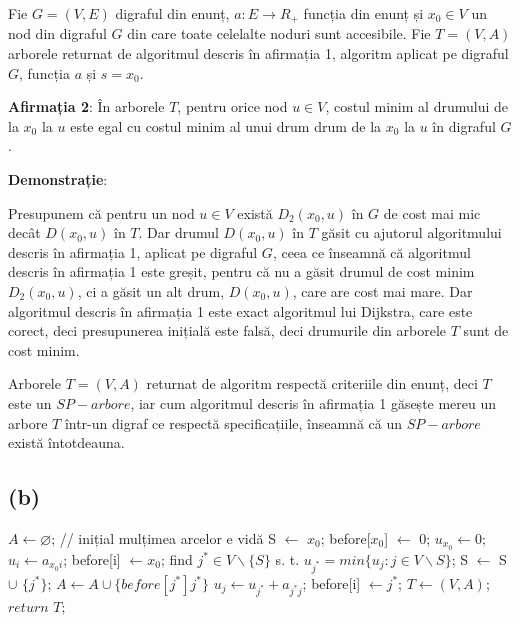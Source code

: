 \documentclass[a4paper,12pt]{article}
\begin{document}
Fie $G=(V,E)$ digraful din enunț, $a:E \rightarrow R _{+}$ funcția din enunț și $x_0 \in V$ un nod din digraful $G$ din care toate celelalte noduri sunt accesibile. Fie $T=(V,A)$ arborele returnat de algoritmul descris în afirmația 1, algoritm aplicat pe digraful $G$, funcția $a$ și $s=x_0$.

\textbf{Afirmația 2}: În arborele $T$, pentru orice nod $u \in V$, costul minim al drumului de la $x_0$ la $u$ este egal cu costul minim al unui drum drum de la $x_0$ la $u$ în digraful $G$.

\textbf{Demonstrație}: 

Presupunem că pentru un nod $u \in V$ există $D_2(x_0,u)$ în $G$ de cost mai mic decât $D(x_0,u)$ în $T$. Dar drumul $D(x_0,u)$ în $T$ găsit cu ajutorul algoritmului descris în afirmația 1, aplicat pe digraful $G$, ceea ce înseamnă că algoritmul descris în afirmația 1 este greșit, pentru că nu a găsit drumul de cost minim $D_2(x_0,u)$, ci a găsit un alt drum, $D(x_0,u)$, care are cost mai mare. Dar algoritmul descris în afirmația 1 este exact algoritmul lui Dijkstra, care este corect, deci presupunerea inițială este falsă, deci drumurile din arborele $T$ sunt de cost minim.

Arborele $T=(V,A)$ returnat de algoritm respectă criteriile din enunț, deci $T$ este un $SP-arbore$, iar cum algoritmul descris în afirmația 1 găsește mereu un arbore $T$ într-un digraf ce respectă specificațiile, înseamnă că un $SP-arbore$ există întotdeauna.

\subsection{(b)}

\begin{algorithm}
	\begin{algorithmic}[1]
		\State $A \gets \varnothing$; // inițial mulțimea arcelor e vidă
		\State S $\gets$ {$x_0$}; before[$x_0$] $\gets$ 0; $u_{x_0} \gets 0$;
				\State $u_{i} \gets a_{x_0i}$; before[i] $\gets x_0$;
			\EndFor
			\State find $j^{*} \in V \backslash \{S\}$ s. t. $u_{j^{*}} = min \{u_j : j \in V \backslash S\}$;
			\State S $\gets$ S $ \cup $ $\{j^{*}\}$;
			\State $A \gets A \cup \{before[j^{*}]j^*\}$
					\State $u_j \gets u_{j^{*}} + a_{j^{*}j}$; before[i] $\gets j^{*}$;
				\EndIf
			\EndFor
		\EndWhile
		\State $T \gets (V,A)$;
		\State $return$ $T$;
	\end{algorithmic}
\end{algorithm}
\end{document}
